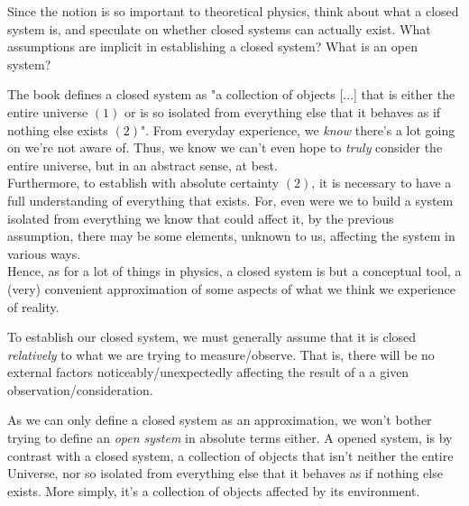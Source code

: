 \documentclass[solutions.tex]{subfiles}
\begin{document}
\maketitle
\begin{exercise}
Since the notion is so important to theoretical physics, think
about what a closed system is, and speculate on whether closed
systems can actually exist. What assumptions are implicit in
establishing a closed system? What is an open system?
\end{exercise}

The book defines a closed system as "a collection of objects [...]
that is either the entire universe $(1)$ or is so isolated from everything
else that it behaves as if nothing else exists $(2)$". From everyday
experience, we \textit{know} there's a lot going on we're not aware of.
Thus, we know we can't even hope to \textit{truly} consider the entire
universe, but in an abstract sense, at best. \\

Furthermore, to establish with absolute certainty $(2)$,
it is necessary to have a full understanding of everything that
exists. For, even were we to build a system isolated from everything
we know that could affect it, by the previous assumption, there may be
some elements, unknown to us, affecting the system in various ways. \\

Hence, as for a lot of things in physics, a closed system is but a
conceptual tool, a (very) convenient approximation of some aspects
of what we think we experience of reality.

\hrr

To establish our closed system, we must generally assume that it is
closed \textit{relatively} to what we are trying to measure/observe.
That is, there will be no external factors noticeably/unexpectedly
affecting the result of a a given observation/consideration. \\

\hrr

As we can only define a closed system as an approximation, we won't
bother trying to define an \textit{open system} in absolute terms
either. A opened system, is by contrast with a closed
system, a collection of objects that isn't neither the entire Universe,
nor so isolated from everything else that it behaves as if nothing
else exists. More simply, it's a collection of objects affected
by its environment.
\end{document}
